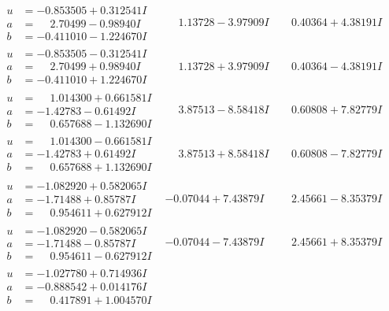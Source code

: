 \documentclass[1p]{elsarticle_modified}
\theoremstyle{definition}
\begin{document}
$$\begin{array}{c|c|c}
\begin{aligned}
u &= -0.853505 + 0.312541 I \\
a &= \phantom{-}2.70499 - 0.98940 I \\
b &= -0.411010 - 1.224670 I\end{aligned}
 & \phantom{-}1.13728 - 3.97909 I & \phantom{-}0.40364 + 4.38191 I \\ \hline\begin{aligned}
u &= -0.853505 - 0.312541 I \\
a &= \phantom{-}2.70499 + 0.98940 I \\
b &= -0.411010 + 1.224670 I\end{aligned}
 & \phantom{-}1.13728 + 3.97909 I & \phantom{-}0.40364 - 4.38191 I \\ \hline\begin{aligned}
u &= \phantom{-}1.014300 + 0.661581 I \\
a &= -1.42783 - 0.61492 I \\
b &= \phantom{-}0.657688 - 1.132690 I\end{aligned}
 & \phantom{-}3.87513 - 8.58418 I & \phantom{-}0.60808 + 7.82779 I \\ \hline\begin{aligned}
u &= \phantom{-}1.014300 - 0.661581 I \\
a &= -1.42783 + 0.61492 I \\
b &= \phantom{-}0.657688 + 1.132690 I\end{aligned}
 & \phantom{-}3.87513 + 8.58418 I & \phantom{-}0.60808 - 7.82779 I \\ \hline\begin{aligned}
u &= -1.082920 + 0.582065 I \\
a &= -1.71488 + 0.85787 I \\
b &= \phantom{-}0.954611 + 0.627912 I\end{aligned}
 & -0.07044 + 7.43879 I & \phantom{-}2.45661 - 8.35379 I \\ \hline\begin{aligned}
u &= -1.082920 - 0.582065 I \\
a &= -1.71488 - 0.85787 I \\
b &= \phantom{-}0.954611 - 0.627912 I\end{aligned}
 & -0.07044 - 7.43879 I & \phantom{-}2.45661 + 8.35379 I \\ \hline\begin{aligned}
u &= -1.027780 + 0.714936 I \\
a &= -0.888542 + 0.014176 I \\
b &= \phantom{-}0.417891 + 1.004570 I\end{aligned}

\end{array}$$
\end{document}

